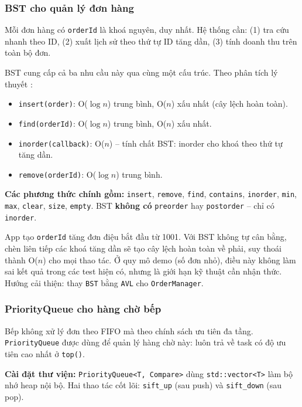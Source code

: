 \documentclass[12pt, a4paper]{article}
\begin{document}
\subsubsection{BST cho quản lý đơn hàng}

Mỗi đơn hàng có \texttt{orderId} là khoá nguyên, duy nhất. Hệ thống cần: (1) tra cứu nhanh theo
ID, (2) xuất lịch sử theo thứ tự ID tăng dần, (3) tính doanh thu trên toàn bộ đơn.

BST cung cấp cả ba nhu cầu này qua cùng một cấu trúc. Theo phân tích lý thuyết \cite{clrs}:
\begin{itemize}
  \item \texttt{insert(order)}: O($\log n$) trung bình, O($n$) xấu nhất (cây lệch hoàn toàn).
  \item \texttt{find(orderId)}: O($\log n$) trung bình, O($n$) xấu nhất.
  \item \texttt{inorder(callback)}: O($n$) -- tính chất BST: inorder cho khoá theo thứ tự tăng dần.
  \item \texttt{remove(orderId)}: O($\log n$) trung bình.
\end{itemize}

\textbf{Các phương thức chính gồm:}
\texttt{insert}, \texttt{remove}, \texttt{find}, \texttt{contains}, \texttt{inorder},
\texttt{min}, \texttt{max}, \texttt{clear}, \texttt{size}, \texttt{empty}.
BST \textbf{không có} \texttt{preorder} hay \texttt{postorder} -- chỉ có \texttt{inorder}.

\begin{notebox}
  App tạo \texttt{orderId} tăng đơn điệu bắt đầu từ 1001. Với BST không tự cân bằng, chèn
  liên tiếp các khoá tăng dần sẽ tạo cây lệch hoàn toàn về phải, suy thoái thành O($n$) cho
  mọi thao tác. Ở quy mô demo (số đơn nhỏ), điều này không làm sai kết quả trong các test
  hiện có, nhưng là giới hạn kỹ thuật cần nhận thức.
  Hướng cải thiện: thay \texttt{BST} bằng \texttt{AVL} cho \texttt{OrderManager}.
\end{notebox}

\subsubsection{PriorityQueue cho hàng chờ bếp}

Bếp không xử lý đơn theo FIFO mà theo chính sách ưu tiên đa tầng. \texttt{PriorityQueue}
được dùng để quản lý hàng chờ này: luôn trả về task có độ ưu tiên cao nhất ở \texttt{top()}.

\textbf{Cài đặt thư viện:} \texttt{PriorityQueue<T, Compare>} dùng \texttt{std::vector<T>}
làm bộ nhớ heap nội bộ. Hai thao tác cốt lõi: \texttt{sift\_up} (sau push) và \texttt{sift\_down}
(sau pop).
\end{document}
